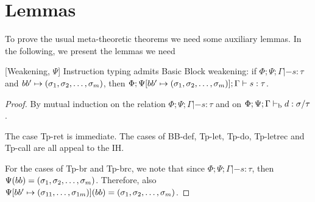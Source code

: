 \documentclass[a4paper, oneside, 10pt, draft]{memoir}
\begin{document}
\section{Lemmas}

To prove the usual meta-theoretic theorems we need some auxiliary
lemmas. In the following, we present the lemmas we need

\begin{lem}{[Weakening, $\Psi$]}
  \label{lem:weaken-psi}
  Instruction typing admits Basic Block weakening: if $\Phi;\Psi;\Gamma
  |- s : \tau$ and $bb' \mapsto (\sigma_1, \sigma_2, \dotsc, \sigma_m)$, then $\Phi;\Psi[bb' \mapsto
  (\sigma_1, \sigma_2, \dotsc, \sigma_m)];\Gamma |- s : \tau$.
\end{lem}
\begin{proof}
  By mutual induction on the relation $\Phi;\Psi;\Gamma |- s : \tau$
  and on $\Phi;\Psi;\Gamma |-_{\mathrm{b}} d : \sigma / \tau$.

  The case Tp-ret is immediate. The cases of BB-def, Tp-let, Tp-do,
  Tp-letrec and Tp-call are all appeal to the IH.

  For the cases of Tp-br and Tp-brc, we note that since
  $\Phi;\Psi;\Gamma |- s : \tau$, then $\Psi(bb) =
  (\sigma_1, \sigma_2, \dotsc, \sigma_m)$. Therefore, also $\Psi[bb' \mapsto (\sigma_{11}, \dotsc,
  \sigma_{1m})](bb) = (\sigma_1, \sigma_2, \dotsc, \sigma_m)$.
\end{proof}
\end{document}
